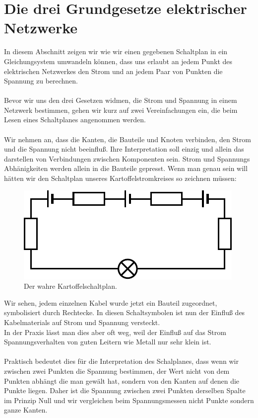 \documentclass[11pt,a4paper,leqno]{report}
\numberwithin{equation}{chapter}
\begin{document}
\section{Die drei Grundgesetze elektrischer Netzwerke}
In diesem Abschnitt zeigen wir wie wir einen gegebenen Schaltplan in ein Gleichungsystem umwandeln k\"onnen, dass uns erlaubt an jedem Punkt des elektrischen Netzwerkes den Strom und an jedem Paar von Punkten die Spannung zu berechnen.\\
\\
Bevor wir uns den drei Gesetzen widmen, die Strom und Spannung in einem Netzwerk bestimmen, gehen wir kurz auf zwei Vereinfachungen ein, die beim Lesen eines Schaltplanes angenommen werden.\\
\\
Wir nehmen an, dass die Kanten, die Bauteile und Knoten verbinden, den Strom und die Spannung nicht beeinflu\ss{}. Ihre Interpretation soll einzig und allein das darstellen von Verbindungen zwischen Komponenten sein. Strom und Spannungs Abh\"anigkeiten werden allein in die Bauteile gepresst. Wenn man genau sein will h\"atten wir den Schaltplan unseres Kartoffelstromkreises so zeichnen m\"ussen:
\begin{figure}[H]
	\begin{center}
		\includegraphics[scale=0.6]{Bilder/true_kartoffel.pdf}
		\caption{Der wahre Kartoffelschaltplan.}
	\end{center}
\end{figure}
\noindent
Wir sehen, jedem einzelnen Kabel wurde jetzt ein Bauteil zugeordnet, symbolisiert durch Rechtecke. In diesen Schaltsymbolen ist nun der Einflu\ss{} des Kabelmaterials auf Strom und Spannung versteckt.\\
In der Praxis l\"asst man dies aber oft weg, weil der Einflu\ss{} auf das Strom Spannungsverhalten von guten Leitern wie Metall nur sehr klein ist.
\\
\\
Praktisch bedeutet dies f\"ur die Interpretation des Schalplanes, dass wenn wir zwischen zwei Punkten die Spannung bestimmen, der Wert nicht von dem Punkten abh\"angt die man gew\"alt hat, sondern von den Kanten auf denen die Punkte liegen. Daher ist die Spannung zwischen zwei Punkten derselben Spalte im Prinzip Null und wir vergleichen beim Spannungsmessen nicht Punkte sondern ganze Kanten.
\end{document}
